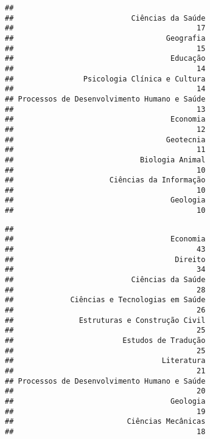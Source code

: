 \documentclass[]{article}
\newenvironment{Shaded}{\begin{snugshade}}{\end{snugshade}}
\newcommand{\KeywordTok}[1]{\textcolor[rgb]{0.13,0.29,0.53}{\textbf{#1}}}
\newcommand{\DataTypeTok}[1]{\textcolor[rgb]{0.13,0.29,0.53}{#1}}
\newcommand{\DecValTok}[1]{\textcolor[rgb]{0.00,0.00,0.81}{#1}}
\newcommand{\StringTok}[1]{\textcolor[rgb]{0.31,0.60,0.02}{#1}}
\newcommand{\OtherTok}[1]{\textcolor[rgb]{0.56,0.35,0.01}{#1}}
\newcommand{\OperatorTok}[1]{\textcolor[rgb]{0.81,0.36,0.00}{\textbf{#1}}}
\newcommand{\NormalTok}[1]{#1}
\begin{document}
\begin{verbatim}
## 
##                           Ciências da Saúde 
##                                          17 
##                                   Geografia 
##                                          15 
##                                    Educação 
##                                          14 
##                Psicologia Clínica e Cultura 
##                                          14 
## Processos de Desenvolvimento Humano e Saúde 
##                                          13 
##                                    Economia 
##                                          12 
##                                   Geotecnia 
##                                          11 
##                             Biologia Animal 
##                                          10 
##                      Ciências da Informação 
##                                          10 
##                                    Geologia 
##                                          10
\end{verbatim}

\begin{Shaded}
\end{Shaded}

\begin{verbatim}
## 
##                                    Economia 
##                                          43 
##                                     Direito 
##                                          34 
##                           Ciências da Saúde 
##                                          28 
##             Ciências e Tecnologias em Saúde 
##                                          26 
##               Estruturas e Construção Civil 
##                                          25 
##                         Estudos de Tradução 
##                                          25 
##                                  Literatura 
##                                          21 
## Processos de Desenvolvimento Humano e Saúde 
##                                          20 
##                                    Geologia 
##                                          19 
##                          Ciências Mecânicas 
##                                          18
\end{verbatim}
\end{document}
